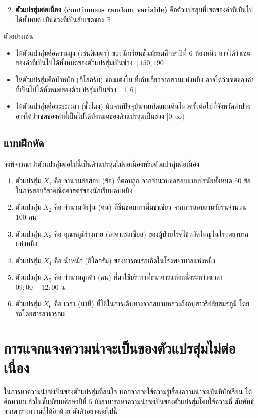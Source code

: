 \begin{enumerate}
	\setcounter{enumi}{1}
	\item \textbf{ตัวแปรสุ่มต่อเนื่อง (continuous random variable)} คือตัวแปรสุ่มที่เซตของค่าที่เป็นไปได้ทั้งหมด เป็นช่วงที่เป็นสับเซตของ $\mathbb{R}$
\end{enumerate}

ตัวอย่างเช่น
\begin{itemize}
	\item ให้ตัวแปรสุ่มคือความสูง (เซนติเมตร) ของนักเรียนชั้นมัธยมศึกษาปีที่ $6$ ห้องหนึ่ง อาจได้ว่าเซต ของค่าที่เป็นไปได้ทั้งหมดของตัวแปรสุ่มเป็นช่วง $[150, 190]$
	\item ให้ตัวแปรสุ่มคือน้ำหนัก (กิโลกรัม) ของแตงโม ที่เก็บเกี่ยวจากสวนแห่งหนึ่ง อาจได้ว่าเซตของค่า ที่เป็นไปได้ทั้งหมดของตัวแปรสุ่มเป็นช่วง $[1, 6]$
	\item ให้ตัวแปรสุ่มคือระยะเวลา (ชั่วโมง) นับจากปัจจุบันจนเกิดแผ่นดินไหวครั้งต่อไปที่จังหวัดลำปาง อาจได้ว่าเซตของค่าที่เป็นไปได้ทั้งหมดของตัวแปรสุ่มเป็นช่วง $[0, \infty)$
\end{itemize}

\newpage

\subsection*{แบบฝึกหัด}
จงพิจารณาว่าตัวแปรสุ่มต่อไปนี้เป็นตัวแปรสุ่มไม่ต่อเนื่องหรือตัวแปรสุ่มต่อเนื่อง
\begin{enumerate}[label=\arabic*., leftmargin=*]
	\item ตัวแปรสุ่ม $X_{1}$ คือ จำนวนข้อสอบ (ข้อ) ที่ตอบถูก จากจำนวนข้อสอบแบบปรนัยทั้งหมด $50$ ข้อ ในการสอบวิชาคณิตศาสตร์ของนักเรียนคนหนึ่ง
	\item ตัวแปรสุ่ม $X_{2}$ คือ จำนวนวัยรุ่น (คน) ที่ชื่นชอบการดื่มชาเขียว จากการสอบถามวัยรุ่นจำนวน $100$ คน
	\item ตัวแปรสุ่ม $X_{3}$ คือ อุณหภูมิร่างกาย (องศาเซลเซียส) ของผู้ป่วยโรคไข้หวัดใหญ่ในโรงพยาบาล แห่งหนึ่ง
	\item ตัวแปรสุ่ม $X_{4}$ คือ น้ำหนัก (กิโลกรัม) ของทารกแรกเกิดในโรงพยาบาลแห่งหนึ่ง
	\item ตัวแปรสุ่ม $X_{5}$ คือ จำนวนลูกค้า (คน) ที่มาใช้บริการที่ธนาคารแห่งหนึ่งระหว่างเวลา $09:00-12:00$ น.
	\item ตัวแปรสุ่ม $X_{6}$ คือ เวลา (นาที) ที่ใช้ในการเดินทางจากสนามหลวงถึงอนุสาวรีย์ชัยสมรภูมิ โดยรถโดยสารสาธารณะ
\end{enumerate}

\newpage
\section{การแจกแจงความน่าจะเป็นของตัวแปรสุ่มไม่ต่อเนื่อง}
ในการหาความน่าจะเป็นของตัวแปรสุ่มที่สนใจ นอกจากจะใช้ความรู้เรื่องความน่าจะเป็นที่นักเรียน ได้ศึกษามาแล้วในชั้นมัธยมศึกษาปีที่ $5$ ยังสามารถหาความน่าจะเป็นของตัวแปรสุ่มโดยใช้ความถี่ สัมพัทธ์จากตารางความถี่ได้อีกด้วย ดังตัวอย่างต่อไปนี้

